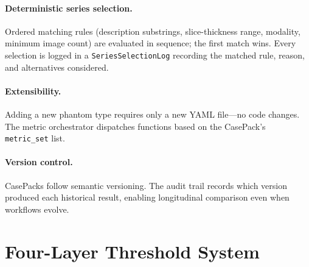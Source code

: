 \documentclass[11pt]{article}
\begin{document}
\paragraph{Deterministic series selection.}
Ordered matching rules (description substrings, slice-thickness
range, modality, minimum image count) are evaluated in sequence;
the first match wins.
Every selection is logged in a \texttt{SeriesSelectionLog} recording
the matched rule, reason, and alternatives considered.

\paragraph{Extensibility.}
Adding a new phantom type requires only a new YAML file---no code
changes.
The metric orchestrator dispatches functions based on the CasePack's
\texttt{metric\_set} list.

\paragraph{Version control.}
CasePacks follow semantic versioning.
The audit trail records which version produced each historical result,
enabling longitudinal comparison even when workflows evolve.


\section{Four-Layer Threshold System}
\label{sec:thresholds}
\end{document}
